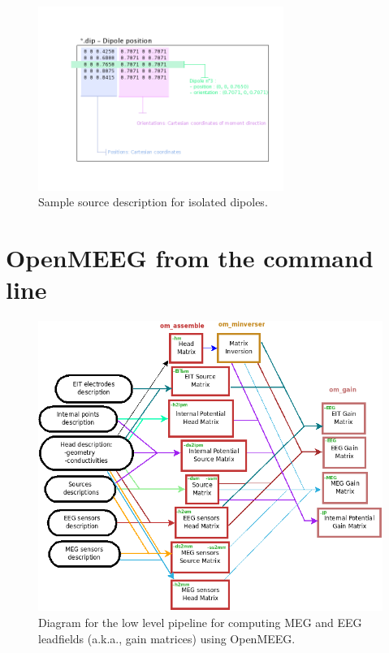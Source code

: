 \documentclass[10pt,journal]{book}
\begin{document}
    \begin{figure}
        \includegraphics[width=8cm]{dipolePositions_en.png}
        \caption{Sample source description for isolated dipoles.}
        \label{fig:dip}
    \end{figure}

\chapter{OpenMEEG from the command line} %
\label{sub:command_line_tools}

\begin{figure}[htbp]
    \centering
        \includegraphics[width=0.95\linewidth]{OpenMEEGSimple}
    \caption{Diagram for the low level pipeline for computing MEG and EEG leadfields (a.k.a., gain matrices) using OpenMEEG.}
    \label{fig:img_OpenMEEGSimple}
\end{figure}
\end{document}

